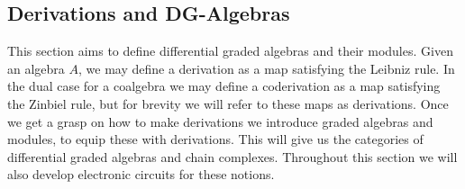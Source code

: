 \documentclass[../thesis.tex]{subfiles}
\begin{document}
    \subsection{Derivations and DG-Algebras}
            This section aims to define differential graded algebras and their modules. Given an algebra $A$, we may define a derivation as a map satisfying the Leibniz rule. In the dual case for a coalgebra we may define a coderivation as a map satisfying the Zinbiel rule, but for brevity we will refer to these maps as derivations. Once we get a grasp on how to make derivations we introduce graded algebras and modules, to equip these with derivations. This will give us the categories of differential graded algebras and chain complexes. Throughout this section we will also develop electronic circuits for these notions.
\end{document}

